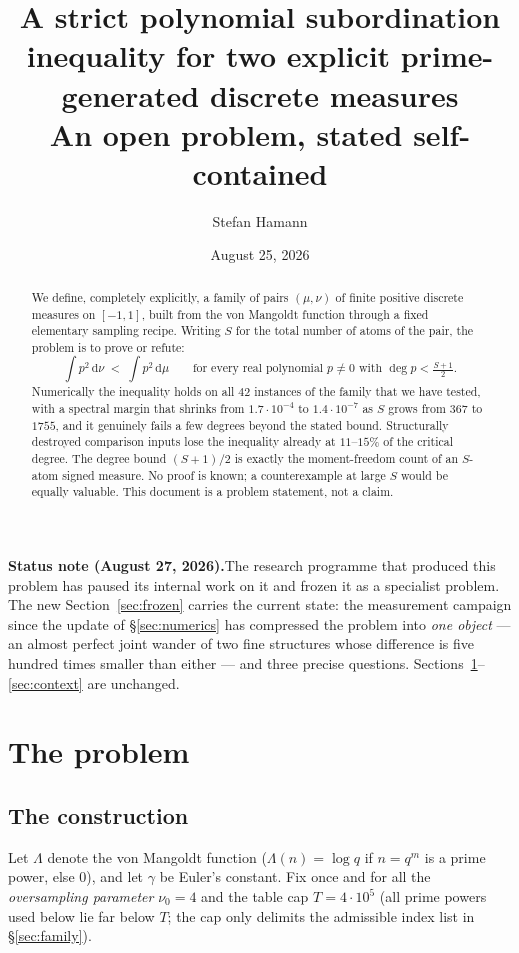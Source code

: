 \documentclass[11pt]{article}
\title{\bfseries A strict polynomial subordination inequality for two
explicit prime-generated discrete measures\\[2mm]
\large An open problem, stated self-contained}
\author{Stefan Hamann}
\date{August 25, 2026}
\theoremstyle{remark}
\newcommand{\dd}{\,\mathrm{d}}
\begin{document}
\maketitle

\begin{abstract}\noindent
We define, completely explicitly, a family of pairs $(\mu,\nu)$ of
finite positive discrete measures on $[-1,1]$, built from the von
Mangoldt function through a fixed elementary sampling recipe.  Writing
$S$ for the total number of atoms of the pair, the problem is to prove
or refute:
\[
\int p^{2}\dd\nu \;<\; \int p^{2}\dd\mu
\qquad\text{for every real polynomial } p\neq 0 \text{ with }
\deg p < \tfrac{S+1}{2}.
\]
Numerically the inequality holds on all $42$ instances of the family
that we have tested, with a spectral margin that shrinks from
$1.7\cdot 10^{-4}$ to $1.4\cdot 10^{-7}$ as $S$ grows from $367$ to
$1755$, and it genuinely fails a few degrees beyond the stated bound.
Structurally destroyed comparison inputs lose the inequality already
at $11$--$15\%$ of the critical degree.  The degree bound
$(S+1)/2$ is exactly the moment-freedom count of an $S$-atom signed
measure.  No proof is known; a counterexample at large $S$ would be
equally valuable.  This document is a problem statement, not a claim.
\end{abstract}

\medskip\noindent
\textbf{Status note (August 27, 2026).}\enspace The research programme
that produced this problem has paused its internal work on it and
frozen it as a specialist problem.  The new
Section~\ref{sec:frozen} carries the current state: the measurement
campaign since the update of \S\ref{sec:numerics} has compressed the
problem into \emph{one object} --- an almost perfect joint wander of
two fine structures whose difference is five hundred times smaller
than either --- and three precise questions.
Sections~\ref{sec:problem}--\ref{sec:context} are unchanged.

\section{The problem}\label{sec:problem}

\subsection{The construction}\label{sec:construction}

Let $\Lambda$ denote the von Mangoldt function
($\Lambda(n)=\log q$ if $n=q^{m}$ is a prime power, else $0$), and let
$\gamma$ be Euler's constant.  Fix once and for all the
\emph{oversampling parameter} $\nu_{0}=4$ and the table cap
$T = 4\cdot 10^{5}$ (all prime powers used below lie far below $T$;
the cap only delimits the admissible index list in
\S\ref{sec:family}).
\end{document}

